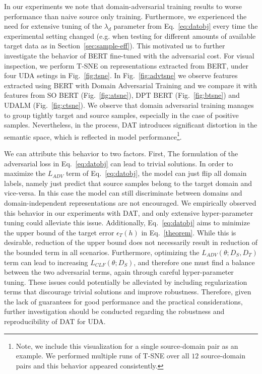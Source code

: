 \documentclass[11pt]{article}
\begin{document}
In our experiments we note that domain-adversarial training results to worse performance than naive source only training. Furthermore, we experienced the need for extensive tuning of the \(\lambda_d\) parameter from Eq.~\ref{eq:datobj} every time the experimental setting changed (e.g. when testing for different amounts of available target data as in Section~\ref{sec:sample-eff}). This motivated us to further investigate the behavior of BERT fine-tuned with the adversarial cost.
For visual inspection, we perform T-SNE \citep{maaten2008visualizing} on representations extracted from BERT, under four UDA setings in Fig.~\ref{fig:tsne}. 
In Fig.~\ref{fig:advtsne} we observe features extracted using BERT with Domain Adversarial Training and we compare it with features from SO BERT (Fig.~\ref{fig:atsne}), DPT BERT (Fig.~\ref{fig:btsne}) and UDALM (Fig.~\ref{fig:ctsne}).
We observe that domain adversarial training manages to group tightly target and source samples, especially in the case of positive samples. Nevertheless, in the process, DAT introduces significant distortion in the semantic space, which is reflected in model performance\footnote{Note, we include this visualization for a single source-domain pair as an example. We performed multiple runs of T-SNE over all $12$ source-domain pairs and this behavior appeared consistently.}.

We can attribute this behavior to two factors. First, The formulation of the adversarial loss in Eq.~\eqref{eq:datobj} can lead to trivial solutions. In order to maximize the \(L_{ADV}\) term of  Eq.~\eqref{eq:datobj}, the model can just flip all domain labels, namely just predict that source samples belong to the target domain and vice-versa. In this case the model can still discriminate between domains and domain-independent representations are not encouraged. We empirically observed this behavior in our experiments with DAT, and only extensive hyper-parameter tuning could alleviate this issue.
Additionally, Eq.~\eqref{eq:datobj} aims to minimize the upper bound of the target error \(\epsilon_T(h)\) in Eq.~\eqref{theorem}. While this is desirable, reduction of the upper bound does not necessarily result in reduction of the bounded term in all scenarios.  
Furthermore, optimizing the \(L_{ADV}(\theta;D_S,D_T)\) term can lead to increasing \(L_{CLF}(\theta;D_S)\), and therefore one must find a balance between the two adversarial terms, again through careful hyper-parameter tuning.
These issues could potentially be alleviated by including regularization terms that discourage trivial solutions and improve robustness.
Therefore, given the lack of guarantees for good performance and the practical considerations, further investigation should be conducted regarding the robustness and reproducibility of DAT for UDA.
\end{document}
